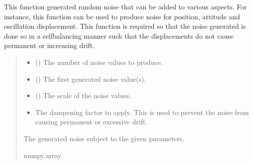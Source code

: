 \documentclass[letterpaper,10pt,english]{sphinxmanual}
\begin{document}
\begin{fulllineitems}
\label{\detokenize{modules/waypoints/generation:qnav.waypoints.generation.produce_noise}}
\pysigstartsignatures
{}
\pysigstopsignatures
\sphinxAtStartPar
This function generated random noise that can be added to various aspects.
For instance, this function can be used to produce noise for position,
attitude and oscillation displacement. This function is required so that
the noise generated is done so in a self\sphinxhyphen{}balancing manner such that the
displacements do not cause permanent or increasing drift.
\begin{quote}\begin{description}
\begin{itemize}
\item {} 
\sphinxAtStartPar
{} () \textendash{} The number of noise values to produce.

\item {} 
\sphinxAtStartPar
{} () \textendash{} The first generated noise value(s).

\item {} 
\sphinxAtStartPar
{} () \textendash{} The scale of the noise values.

\item {} 
\sphinxAtStartPar
{} \textendash{} The dampening factor to apply. This is used to prevent the
noise from causing permanent or excessive drift.

\end{itemize}

\sphinxAtStartPar
The generated noise subject to the given parameters.

\sphinxAtStartPar
numpy.array

\end{description}\end{quote}

\end{fulllineitems}
\end{document}
